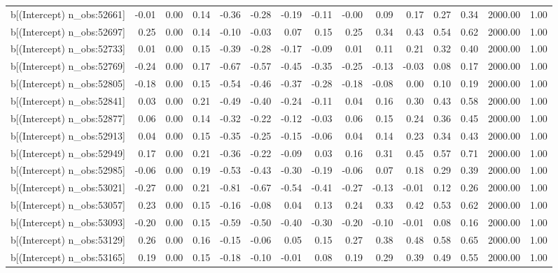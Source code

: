 \begin{table}[ht]
\begin{tabular}{rrrrrrrrrrrrrrr}
  b[(Intercept) n\_obs:52661] & -0.01 & 0.00 & 0.14 & -0.36 & -0.28 & -0.19 & -0.11 & -0.00 & 0.09 & 0.17 & 0.27 & 0.34 & 2000.00 & 1.00 \\ 
  b[(Intercept) n\_obs:52697] & 0.25 & 0.00 & 0.14 & -0.10 & -0.03 & 0.07 & 0.15 & 0.25 & 0.34 & 0.43 & 0.54 & 0.62 & 2000.00 & 1.00 \\ 
  b[(Intercept) n\_obs:52733] & 0.01 & 0.00 & 0.15 & -0.39 & -0.28 & -0.17 & -0.09 & 0.01 & 0.11 & 0.21 & 0.32 & 0.40 & 2000.00 & 1.00 \\ 
  b[(Intercept) n\_obs:52769] & -0.24 & 0.00 & 0.17 & -0.67 & -0.57 & -0.45 & -0.35 & -0.25 & -0.13 & -0.03 & 0.08 & 0.17 & 2000.00 & 1.00 \\ 
  b[(Intercept) n\_obs:52805] & -0.18 & 0.00 & 0.15 & -0.54 & -0.46 & -0.37 & -0.28 & -0.18 & -0.08 & 0.00 & 0.10 & 0.19 & 2000.00 & 1.00 \\ 
  b[(Intercept) n\_obs:52841] & 0.03 & 0.00 & 0.21 & -0.49 & -0.40 & -0.24 & -0.11 & 0.04 & 0.16 & 0.30 & 0.43 & 0.58 & 2000.00 & 1.00 \\ 
  b[(Intercept) n\_obs:52877] & 0.06 & 0.00 & 0.14 & -0.32 & -0.22 & -0.12 & -0.03 & 0.06 & 0.15 & 0.24 & 0.36 & 0.45 & 2000.00 & 1.00 \\ 
  b[(Intercept) n\_obs:52913] & 0.04 & 0.00 & 0.15 & -0.35 & -0.25 & -0.15 & -0.06 & 0.04 & 0.14 & 0.23 & 0.34 & 0.43 & 2000.00 & 1.00 \\ 
  b[(Intercept) n\_obs:52949] & 0.17 & 0.00 & 0.21 & -0.36 & -0.22 & -0.09 & 0.03 & 0.16 & 0.31 & 0.45 & 0.57 & 0.71 & 2000.00 & 1.00 \\ 
  b[(Intercept) n\_obs:52985] & -0.06 & 0.00 & 0.19 & -0.53 & -0.43 & -0.30 & -0.19 & -0.06 & 0.07 & 0.18 & 0.29 & 0.39 & 2000.00 & 1.00 \\ 
  b[(Intercept) n\_obs:53021] & -0.27 & 0.00 & 0.21 & -0.81 & -0.67 & -0.54 & -0.41 & -0.27 & -0.13 & -0.01 & 0.12 & 0.26 & 2000.00 & 1.00 \\ 
  b[(Intercept) n\_obs:53057] & 0.23 & 0.00 & 0.15 & -0.16 & -0.08 & 0.04 & 0.13 & 0.24 & 0.33 & 0.42 & 0.53 & 0.62 & 2000.00 & 1.00 \\ 
  b[(Intercept) n\_obs:53093] & -0.20 & 0.00 & 0.15 & -0.59 & -0.50 & -0.40 & -0.30 & -0.20 & -0.10 & -0.01 & 0.08 & 0.16 & 2000.00 & 1.00 \\ 
  b[(Intercept) n\_obs:53129] & 0.26 & 0.00 & 0.16 & -0.15 & -0.06 & 0.05 & 0.15 & 0.27 & 0.38 & 0.48 & 0.58 & 0.65 & 2000.00 & 1.00 \\ 
  b[(Intercept) n\_obs:53165] & 0.19 & 0.00 & 0.15 & -0.18 & -0.10 & -0.01 & 0.08 & 0.19 & 0.29 & 0.39 & 0.49 & 0.55 & 2000.00 & 1.00 \\ 

\end{tabular}
\end{table}
